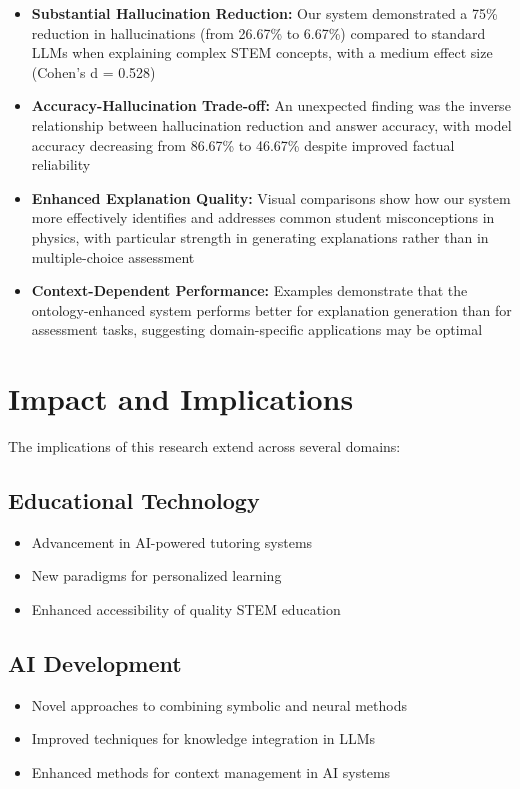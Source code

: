 \begin{itemize}
    \item \textbf{Substantial Hallucination Reduction:} Our system demonstrated a 75\% reduction in hallucinations (from 26.67\% to 6.67\%) compared to standard LLMs when explaining complex STEM concepts, with a medium effect size (Cohen's d = 0.528)
    
    \item \textbf{Accuracy-Hallucination Trade-off:} An unexpected finding was the inverse relationship between hallucination reduction and answer accuracy, with model accuracy decreasing from 86.67\% to 46.67\% despite improved factual reliability
    
    \item \textbf{Enhanced Explanation Quality:} Visual comparisons show how our system more effectively identifies and addresses common student misconceptions in physics, with particular strength in generating explanations rather than in multiple-choice assessment
    
    \item \textbf{Context-Dependent Performance:} Examples demonstrate that the ontology-enhanced system performs better for explanation generation than for assessment tasks, suggesting domain-specific applications may be optimal
\end{itemize}



\section{Impact and Implications}
\label{sec:impact}

The implications of this research extend across several domains:

\subsection{Educational Technology}
\begin{itemize}
    \item Advancement in AI-powered tutoring systems~\cite{rivera2024impact}
    \item New paradigms for personalized learning~\cite{zhang2024future}
    \item Enhanced accessibility of quality STEM education~\cite{rodriguez2024adaptive}
\end{itemize}

\subsection{AI Development}
\begin{itemize}
    \item Novel approaches to combining symbolic and neural methods~\cite{lewis2024neuro}
    \item Improved techniques for knowledge integration in LLMs~\cite{huang2024survey}
    \item Enhanced methods for context management in AI systems~\cite{su2024confabulation}
\end{itemize}


